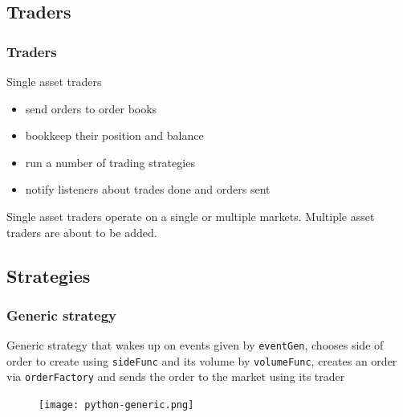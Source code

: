 \documentclass{beamer}
\begin{document}
\subsection{Traders}
\begin{frame}
\frametitle{Traders}
Single asset traders
\begin{itemize}
  \item send orders to order books
  \item bookkeep their position and balance
  \item run a number of trading strategies
  \item notify listeners about trades done and orders sent
\end{itemize}
Single asset traders operate on a single or multiple markets.
Multiple asset traders are about to be added.
\end{frame}

\subsection{Strategies}
\begin{frame}
\frametitle{Generic strategy}
Generic strategy that wakes up on events given by \texttt{eventGen},
chooses side of order to create using \texttt{sideFunc} and its volume by \texttt{volumeFunc},
creates an order via \texttt{orderFactory} and sends the order to the market using its trader
\begin{figure}[htbp]
\centering
\texttt{[image: python-generic.png]}
\end{figure}
\end{frame}

\end{document}
